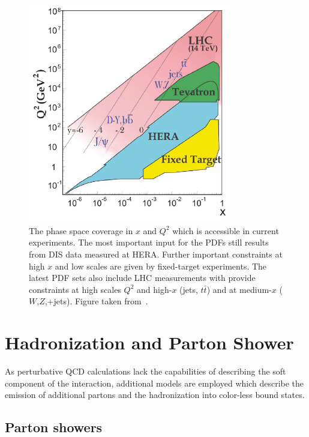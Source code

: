\begin{figure}[htb] 
    \centering
    \includegraphics[width=0.8\textwidth]{figures/sm_model/phasespace.pdf}\hfill
    \caption[Kinematic phase space region of the experiments]{The phase space
        coverage in $x$ and $Q^2$ which is accessible in current experiments.
        The most important input for the PDFs still results from DIS data
        measured at HERA. Further important constraints at high $x$ and low
        scales are given by fixed-target experiments. The latest PDF sets also
        include LHC measurements with provide constraints at high scales $Q^2$
        and high-$x$ (jets, $t\bar t$) and at medium-$x$ ($W$,$Z$,+jets). Figure
        taken from~\cite{Agashe:2014kda}.} 
    \label{fig:kinematic_phasepace} 
\end{figure}

\section{Hadronization and Parton Shower}

As perturbative QCD calculations lack the capabilities of describing the
soft component of the interaction, additional models are employed which describe
the emission of additional partons and the hadronization into color-less bound
states. 

\subsection{Parton showers}

